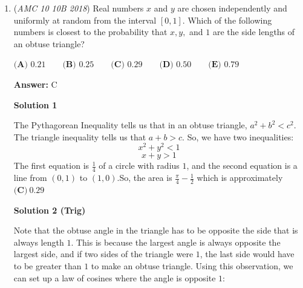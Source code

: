 \begin{enumerate}
\textbf{Solution 8}

The key point is that $n$ is even. Also, $323n < 10000 \implies n \leq 30$. The key idea is that $323 = 17 \cdot 19$. If we were to divide by some $n < 17$, then dividing by 17 yields a smaller value, which is not allowed. Hence, consider $n = 18$ in which $19 \cdot 18 = 342$ is obtained. 

 Now we check the next value, when $n = 20$ so we can check 19. In that case, $17 \cdot 20 = 340$ is formed.

 We now prove no other values exist. Simply speaking, if $n > 20$, then consider $323 \cdot n$. If $n$ is a prime, dividing by $n$ gives 323, and the next number is anyways $17 \cdot n$. This however is minimized at $n = 20$, hence no cases arise. Similarly, if $n$ is composite with a prime factorization, one can still rewrite it of the form $323 \cdot n$. But all prime factors of $n$ are less than or equal to 15, hence the minimum is still at when we divide by 19, in which $17 \cdot n$. But this is still minimized at $n = 20$, hence no cases arise. $\blacksquare$

 The answer is $\boxed{340}$, and we are done. $\square$



	\item (\textit{AMC 10 10B 2018}) Real numbers $x$ and $y$ are chosen independently and uniformly at random from the interval $[0,1]$. Which of the following numbers is closest to the probability that $x,y,$ and $1$ are the side lengths of an obtuse triangle?


 $\textbf{(A) }0.21 \qquad \textbf{(B) }0.25 \qquad \textbf{(C) }0.29 \qquad \textbf{(D) }0.50 \qquad \textbf{(E) }0.79 \qquad$

 \textbf{Answer: }C



\textbf{Solution 1}

The Pythagorean Inequality tells us that in an obtuse triangle, $a^{2} + b^{2} < c^{2}$. The triangle inequality tells us that $a + b > c$. So, we have two inequalities:
 \[x^2 + y^2 < 1\]
 \[x + y > 1\]The first equation is $\frac14$ of a circle with radius $1$, and the second equation is a line from $(0, 1)$ to $(1, 0)$.So, the area is $\frac{\pi}{4} - \frac12$ which is approximately $\boxed{\textbf{(C)} ~0.29}$




\textbf{Solution 2 (Trig)}

Note that the obtuse angle in the triangle has to be opposite the side that is always length $1$. This is because the largest angle is always opposite the largest side, and if two sides of the triangle were $1$, the last side would have to be greater than $1$ to make an obtuse triangle. Using this observation, we can set up a law of cosines where the angle is opposite $1$:


\end{enumerate}
